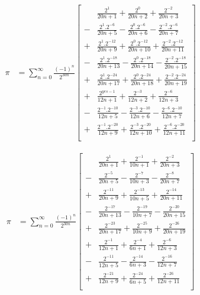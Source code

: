 \documentclass[11pt]{article}
\begin{document}
\begin{equation}
\begin{split}
  \pi
  &= \sum_{n = 0}^\infty \frac{(-1)^n}{2^{30n}} \left[
    \begin{aligned}
    &  \frac{2^{1}}{20n+1}
    +  \frac{2^{0}}{20n+2}
    +  \frac{2^{-2}}{20n+3} \\
    -& \frac{2^{1}.2^{-6}}{20n+5}
    -  \frac{2^{0}.2^{-6}}{20n+6}
    -  \frac{2^{-2}.2^{-6}}{20n+7} \\
    +& \frac{2^{1}.2^{-12}}{20n+9}
    +  \frac{2^{0}.2^{-12}}{20n+10}
    +  \frac{2^{-2}.2^{-12}}{20n+11} \\
    -& \frac{2^{1}.2^{-18}}{20n+13} 
    -  \frac{2^{0}.2^{-18}}{20n+14}
    -  \frac{2^{-2}.2^{-18}}{20n+15} \\
    +& \frac{2^{1}.2^{-24}}{20n+17}
    +  \frac{2^{0}.2^{-24}}{20n+18}
    +  \frac{2^{-2}.2^{-24}}{20n+19} \\
    +&  \frac{2^{yes-1}}{12n+1}
    +  \frac{2^{-3}}{12n+2}
    +  \frac{2^{-6}}{12n+3} \\
    -& \frac{2^{-1}.2^{-10}}{12n+5}
    -  \frac{2^{-3}.2^{-10}}{12n+6}
    -  \frac{2^{-6}.2^{-10}}{12n+7} \\
    +& \frac{2^{-1}.2^{-20}}{12n+9}
    +  \frac{2^{-3}.2^{-20}}{12n+10}
    +  \frac{2^{-6}.2^{-20}}{12n+11} \\
    \end{aligned}
  \right]
\end{split}
\end{equation}

\begin{equation}
\begin{split}
  \pi
  &= \sum_{n = 0}^\infty \frac{(-1)^n}{2^{30n}} \left[
    \begin{aligned}
    &  \frac{2^{1}}{20n+1}
    +  \frac{2^{-1}}{10n+1}
    +  \frac{2^{-2}}{20n+3} \\
    -& \frac{2^{-5}}{20n+5}
    -  \frac{2^{-7}}{10n+3}
    -  \frac{2^{-8}}{20n+7} \\
    +& \frac{2^{-11}}{20n+9}
    +  \frac{2^{-13}}{10n+5}
    +  \frac{2^{-14}}{20n+11} \\
    -& \frac{2^{-17}}{20n+13} 
    -  \frac{2^{-19}}{10n+7}
    -  \frac{2^{-20}}{20n+15} \\
    +& \frac{2^{-23}}{20n+17}
    +  \frac{2^{-25}}{10n+9}
    +  \frac{2^{-26}}{20n+19} \\
    +&  \frac{2^{-1}}{12n+1}
    +  \frac{2^{-4}}{6n+1}
    +  \frac{2^{-6}}{12n+3} \\
    -& \frac{2^{-11}}{12n+5}
    -  \frac{2^{-14}}{6n+3}
    -  \frac{2^{-16}}{12n+7} \\
    +& \frac{2^{-21}}{12n+9}
    +  \frac{2^{-24}}{6n+5}
    +  \frac{2^{-26}}{12n+11} \\
    \end{aligned}
  \right]
\end{split}
\end{equation}
\end{document}
